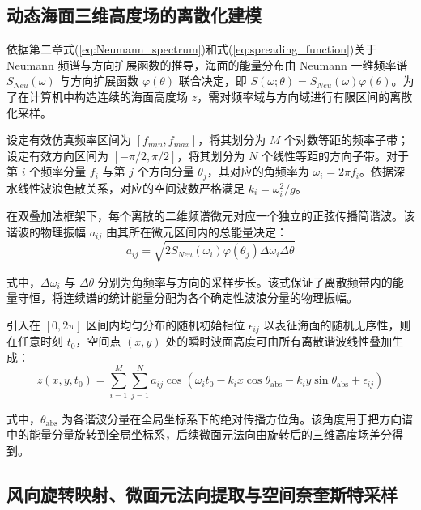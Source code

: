 \subsection{动态海面三维高度场的离散化建模}
\label{subsec:3d_surface_reconstruction}

依据第二章式(\ref{eq:Neumann_spectrum})和式(\ref{eq:spreading_function})关于 Neumann 频谱与方向扩展函数的推导，海面的能量分布由 Neumann 一维频率谱 $S_{Neu}(\omega)$ 与方向扩展函数 $\varphi(\theta)$ 联合决定，即 $S(\omega;\theta) = S_{Neu}(\omega)\varphi(\theta)$。为了在计算机中构造连续的海面高度场 $z$，需对频率域与方向域进行有限区间的离散化采样。

设定有效仿真频率区间为 $[f_{min}, f_{max}]$，将其划分为 $M$ 个对数等距的频率子带；设定有效方向区间为 $[-\pi/2, \pi/2]$，将其划分为 $N$ 个线性等距的方向子带。对于第 $i$ 个频率分量 $f_i$ 与第 $j$ 个方向分量 $\theta_j$，其对应的角频率为 $\omega_i = 2\pi f_i$。依据深水线性波浪色散关系，对应的空间波数严格满足 $k_i = \omega_i^2 / g$。

在双叠加法框架下，每个离散的二维频谱微元对应一个独立的正弦传播简谐波。该谐波的物理振幅 $a_{ij}$ 由其所在微元区间内的总能量决定：
\begin{equation}
	a_{ij} = \sqrt{2 S_{Neu}(\omega_i) \varphi(\theta_j) \Delta \omega_i \Delta \theta}
	\label{eq:amplitude_ij}
\end{equation}

式中，$\Delta \omega_i$ 与 $\Delta \theta$ 分别为角频率与方向的采样步长。该式保证了离散频带内的能量守恒，将连续谱的统计能量分配为各个确定性波浪分量的物理振幅。

引入在 $[0, 2\pi]$ 区间内均匀分布的随机初始相位 $\epsilon_{ij}$ 以表征海面的随机无序性，则在任意时刻 $t_0$，空间点 $(x, y)$ 处的瞬时波面高度可由所有离散谐波线性叠加生成：
\begin{equation}
z(x, y, t_0) = \sum_{i=1}^{M} \sum_{j=1}^{N} a_{ij} \cos\left( \omega_i t_0 - k_i x \cos\theta_{\mathrm{abs}} - k_i y \sin\theta_{\mathrm{abs}} + \epsilon_{ij} \right)
	\label{eq:double_superposition_actual}
\end{equation}

式中，$\theta_{\mathrm{abs}}$ 为各谐波分量在全局坐标系下的绝对传播方位角。该角度用于把方向谱中的能量分量旋转到全局坐标系，后续微面元法向由旋转后的三维高度场差分得到。

\subsection{风向旋转映射、微面元法向提取与空间奈奎斯特采样}

